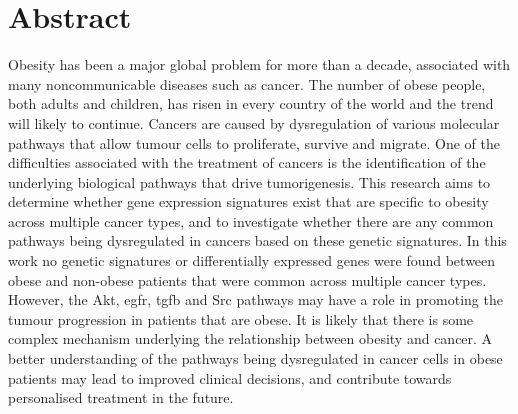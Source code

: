 \vspace*{\fill}

\section*{\centering Abstract}

Obesity has been a major global problem for more than a decade, associated with many noncommunicable diseases such as  cancer.
The number of obese people, both adults and children, has risen in every country of the world and the trend will likely to continue.
Cancers are caused by dysregulation of various molecular pathways that allow tumour cells to proliferate, survive and migrate.
One of the difficulties associated with the treatment of cancers is the identification of the underlying biological pathways that drive tumorigenesis.
This research aims to determine whether gene expression signatures exist  that are specific to obesity across multiple cancer types, and to investigate whether there are any common pathways being dysregulated in cancers based on these genetic signatures.
In this work no genetic signatures or differentially expressed genes were found between obese and non-obese patients that were common across multiple cancer types.
However, the Akt, \gls{egfr}, \gls{tgfb} and Src pathways may have a role in promoting the tumour progression in patients that are obese.
It is likely that there is some complex mechanism underlying the relationship between obesity and cancer.
A better understanding of the pathways being dysregulated in cancer cells in obese patients may lead to improved clinical decisions, and contribute towards personalised treatment in the future.

\vfill
\vfill
